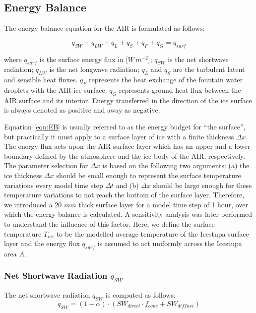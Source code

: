 \documentclass[utf8]{frontiersSCNS} %
\begin{document}
\subsection{Energy Balance} \label{section:EB}

The energy balance equation \citep{Hock_2005} for the AIR is formulated as follows:

\begin{equation} q_{SW} + q_{LW} + q_{L} + q_{S} + q_{F} + q_{G} = q_{surf} \label{eqn:EB} \end{equation}

where $q_{surf}$ is the surface energy flux in [$W\,m^{-2}$]; $q_{SW}$ is the net shortwave radiation; $q_{LW}$ is the
net longwave radiation; $q_{L}$ and $q_{S}$ are the turbulent latent and sensible heat fluxes. $q_{F}$ represents the heat
exchange of the fountain water droplets with the AIR ice surface. $q_{G}$ represents ground heat flux between the AIR
surface and its interior. Energy transferred in the direction of the ice surface is always denoted as positive and
away as negative.

Equation \ref{eqn:EB} is usually referred to as the energy budget for “the surface”, but practically it must apply to
a surface layer of ice with a finite thickness $\Delta x$. The energy flux acts upon the AIR surface layer which
has an upper and a lower boundary defined by the atmosphere and the ice body of the AIR, respectively. The
parameter selection for $\Delta x$ is based on the following two arguments: (a) the ice thickness $\Delta x$ should be
small enough to represent the surface temperature variations every model time step $\Delta t$ and (b) $\Delta x$ should
be large enough for these temperature variations to not reach the bottom of the surface layer.  Therefore, we introduced
a 20 $mm$ thick surface layer for a model time step of 1 hour, over which the energy balance is calculated. A
sensitivity analysis was later performed to understand the influence of this factor. Here, we define the surface
temperature $T_{ice}$ to be the modelled average temperature of the Icestupa surface layer and the energy flux $q_{surf}$
is assumed to act uniformly across the Icestupa area $A$.

\subsubsection{Net Shortwave Radiation \texorpdfstring{$q_{SW}$}{Lg}}
The net shortwave radiation $q_{SW}$ is computed as follows:
\begin{equation} q_{SW} = (1- \alpha)\cdot (SW_{direct} \cdot f_{cone} + SW_{diffuse}) \label{eqn:SW} \end{equation}
\end{document}
